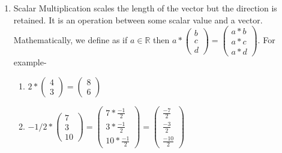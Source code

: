 \documentclass{article}
\begin{document}
\begin{enumerate}
\item Scalar Multiplication scales the length of the vector but the  direction is retained. It is an operation between some scalar value and a vector. Mathematically, we define as if $a\in \mathbb{R}$ then
$a*\begin{pmatrix}
b\\c\\d

\end{pmatrix}=
\begin{pmatrix}
a*b\\a*c\\a*d
\end{pmatrix}$. For example-
\begin{enumerate}
    \item $2*\begin{pmatrix}
4\\
3
\end{pmatrix}=
\begin{pmatrix}
8\\
6
\end{pmatrix}$\\

\item $-1/2*\begin{pmatrix}
7\\3\\10
\end{pmatrix}=
\begin{pmatrix}
7*\frac{-1}{2}\\3*\frac{-1}{2}\\10*\frac{-1}{2}
\end{pmatrix}=
\begin{pmatrix}
\frac{-7}{2}\\\frac{-3}{2}\\\frac{-10}{2}
\end{pmatrix}$\\

\end{enumerate}
\end{enumerate}
\end{document}
